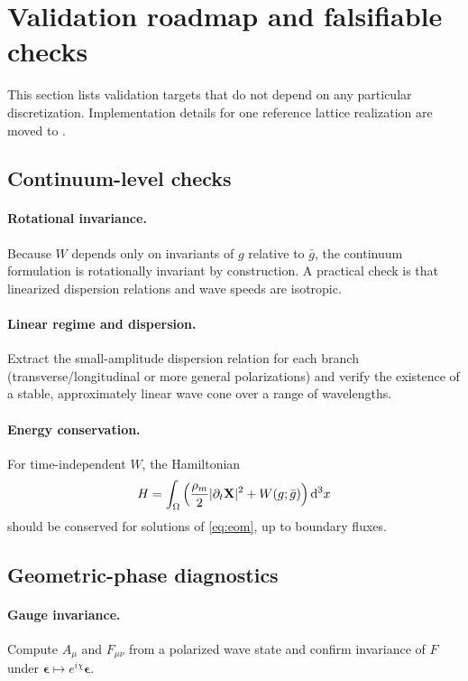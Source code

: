 \section{Validation roadmap and falsifiable checks}
\label{sec:validation}

This section lists validation targets that do not depend on any particular discretization.
Implementation details for one reference lattice realization are moved to .

\subsection{Continuum-level checks}

\paragraph{Rotational invariance.}
Because $W$ depends only on invariants of $g$ relative to $\bar g$,
the continuum formulation is rotationally invariant by construction.
A practical check is that linearized dispersion relations and wave speeds are isotropic.

\paragraph{Linear regime and dispersion.}
Extract the small-amplitude dispersion relation for each branch
(transverse/longitudinal or more general polarizations) and verify the existence of a stable,
approximately linear wave cone over a range of wavelengths.

\paragraph{Energy conservation.}
For time-independent $W$, the Hamiltonian
\begin{equation}
  H = \int_\Omega \left(\frac{\rho_m}{2}|\partial_t \mathbf{X}|^2 + W(g;\bar g)\right)\mathrm{d}^3x
\end{equation}
should be conserved for solutions of \eqref{eq:eom}, up to boundary fluxes.

\subsection{Geometric-phase diagnostics}

\paragraph{Gauge invariance.}
Compute $A_\mu$ and $F_{\mu\nu}$ from a polarized wave state and confirm invariance of $F$ under
$\bm{\epsilon}\mapsto e^{i\chi}\bm{\epsilon}$.

